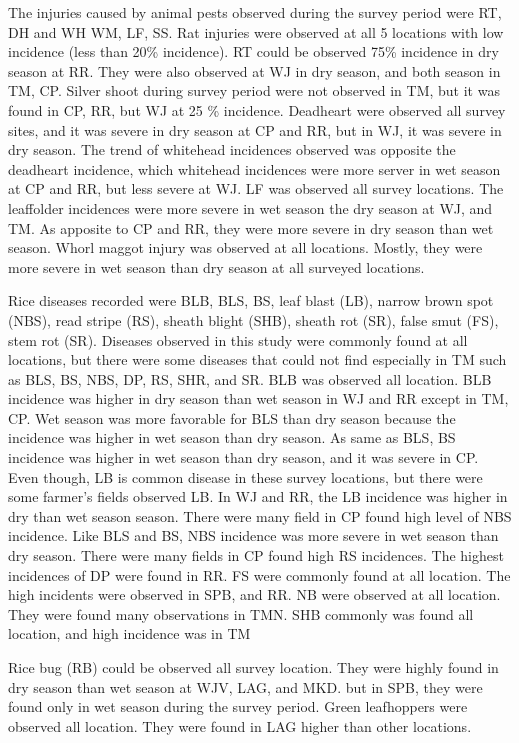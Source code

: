 The injuries caused by animal pests observed during the survey period were RT, DH and WH WM, LF, SS. Rat injuries were observed at all 5 locations with low incidence (less than 20\% incidence). RT could be observed 75\% incidence in dry season at RR. They were also observed at WJ in dry season, and both season in TM, CP. Silver shoot during survey period were not observed in TM, but it was found in CP, RR, but WJ at 25 \% incidence. Deadheart were observed all survey sites, and it was severe in dry season at CP and RR, but in WJ, it was severe in dry season. The trend of whitehead incidences observed was opposite the deadheart incidence, which whitehead incidences were more server in wet season at CP and RR, but less severe at WJ. LF was observed all survey locations. The leaffolder incidences were more severe in wet season the dry season at WJ, and TM. As apposite to CP and RR, they were more severe in dry season than wet season. Whorl maggot injury was observed at all locations. Mostly, they were more severe in wet season than dry season at all surveyed locations.

Rice diseases recorded were BLB, BLS, BS, leaf blast (LB), narrow brown spot (NBS), read stripe (RS), sheath blight (SHB), sheath rot (SR), false smut (FS), stem rot (SR). Diseases observed in this study were commonly found at all locations, but there were some diseases that could not find especially in TM such as BLS, BS, NBS, DP, RS, SHR, and SR. BLB was observed all location. BLB incidence was higher in dry season than wet season in WJ and RR except in TM, CP. Wet season was more favorable for BLS than dry season because the incidence was higher in wet season than dry season. As same as BLS, BS incidence was higher in wet season than dry season, and it was severe in CP. Even though, LB is common disease in these survey locations, but there were some farmer’s fields observed LB. In WJ and RR, the LB incidence was higher in dry than wet season season. There were many field in CP found high level of NBS incidence. Like BLS and BS, NBS incidence was more severe in wet season than dry season. There were many fields in CP found high RS incidences. The highest incidences of DP were found in RR. FS were commonly found at all location. The high incidents were observed in SPB, and RR. NB were observed at all location. They were found many observations in TMN.  SHB commonly was found all location, and high incidence was in TM 

Rice bug (RB) could be observed all survey location. They were highly found in dry season than wet season at WJV, LAG, and MKD. but in SPB, they were found only in wet season during the survey period.  Green leafhoppers were observed all location. They were found in LAG higher than other locations.

